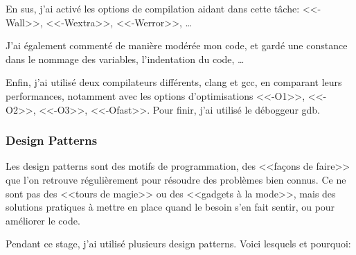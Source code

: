 \documentclass[a4paper,french,12pt]{article}
\begin{document}
	    En sus, j'ai activé les options de compilation aidant dans cette tâche: <<-Wall>>, <<-Wextra>>, <<-Werror>>, \ldots
	    
	    J'ai également commenté de manière modérée mon code, et gardé une constance dans le nommage des variables,
	    l'indentation du code, \ldots
	    
	    Enfin, j'ai utilisé deux compilateurs différents, clang et gcc, en comparant leurs performances,
	    notamment avec les options d'optimisations <<-O1>>, <<-O2>>, <<-O3>>, <<-Ofast>>.
	    Pour finir, j'ai utilisé le déboggeur gdb.
	    
	  \subsubsection{Design Patterns}
	    Les design patterns sont des motifs de programmation, des <<façons de faire>> que l'on retrouve régulièrement 
	    pour résoudre des problèmes bien connus. Ce ne sont pas des <<tours de magie>> ou des  <<gadgets à la mode>>,
	    mais des solutions pratiques à mettre en place quand le besoin s'en fait sentir, ou pour améliorer le code.
	    
	    Pendant ce stage, j'ai utilisé plusieurs design patterns. Voici lesquels et pourquoi:
	    
\end{document}
